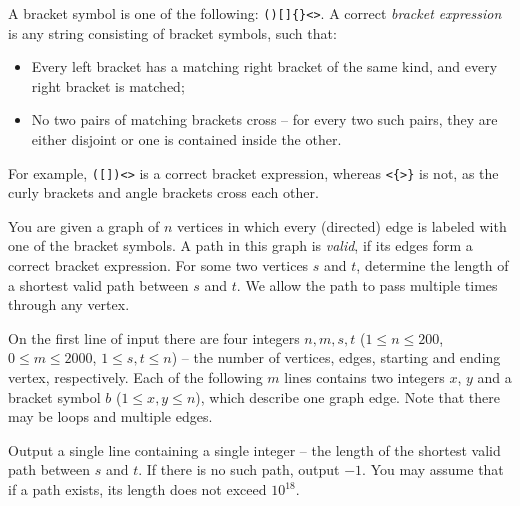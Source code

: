 










A bracket symbol is one of the following: \texttt{()[]\{\}<>}. A correct \textit{bracket expression} is any string consisting of bracket symbols, such that:
\begin{itemize}
 \item Every left bracket has a matching right bracket of the same kind, and every right bracket is matched;
 \item No two pairs of matching brackets cross -- for every two such pairs, they are either disjoint or one is contained inside the other.
\end{itemize}
For example, \texttt{([])<>} is a correct bracket expression, whereas \texttt{<\{>\}} is not, as the curly brackets and angle brackets cross each other.

You are given a graph of $n$ vertices in which every (directed) edge is labeled with one of the bracket symbols. A path in this graph is \textit{valid}, if its edges form a correct bracket expression. For some two vertices $s$ and $t$, determine the length of a shortest valid path between $s$ and $t$. We allow the path to pass multiple times through any vertex.



On the first line of input there are four integers $n, m, s, t$ ($1 \leq n \leq 200$, $0 \leq m \leq 2000$, $1 \leq s, t \leq n$) -- the number of vertices, edges, starting and ending vertex, respectively.
Each of the following $m$ lines contains two integers $x$, $y$ and a bracket symbol $b$ ($1 \leq x, y \leq n$), which describe one graph edge. Note that there may be loops and multiple edges.


Output a single line containing a single integer -- the length of the shortest valid path between $s$ and $t$. If there is no such path, output $-1$. You may assume that if a path exists, its length does not exceed $10^{18}$.

